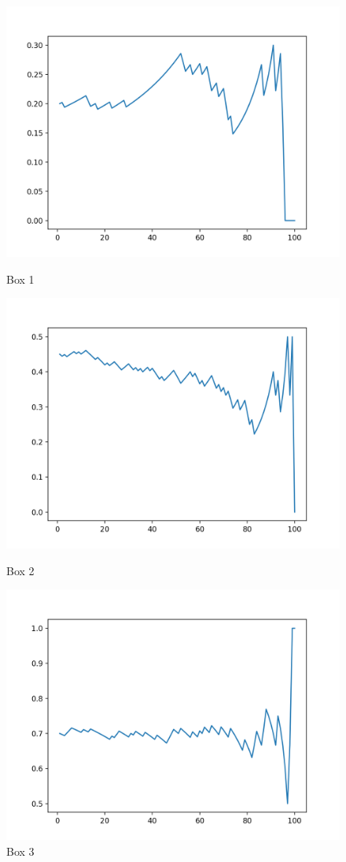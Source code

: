 \documentclass[12pt]{article}
\begin{document}
\begin{figure}[H]
  \includegraphics[width=\linewidth]{fig/fig_p26_1.png}
  \caption{Box 1}
\endminipage\hfill
{}
  \includegraphics[width=\linewidth]{fig/fig_p26_2.png}
  \caption{Box 2}
\endminipage\hfill
{}%
  \includegraphics[width=\linewidth]{fig/fig_p26_3.png}
  \caption{Box 3}
\endminipage
\end{figure}
\end{document}
